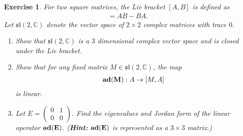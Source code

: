 \documentclass[11pt]{article}
\newtheorem{exercise}{Exercise}[section]
\theoremstyle{definition}
\numberwithin{equation}{subsection}
\begin{document}
\medskip

\begin{exercise}
For two square matrices, the Lie bracket $[A, B]$ is defined as
\begin{align*}
    [A, B] = AB - BA.
\end{align*}
Let $\mathfrak{sl}(2, \mathbb{C})$ denote the vector space of $2 \times 2$ complex matrices with trace $0$.
\begin{enumerate}[label=(\alph*)]
    \item Show that $\mathfrak{sl}(2, \mathbb{C})$ is a $3$ dimensional complex vector space and is closed under the Lie bracket.
    
    \item Show that for any fixed matrix $M \in \mathfrak{sl}(2, \mathbb{C})$, the map
    \begin{align*}
        {\bf ad}({\bf M}): A \to [M, A]
    \end{align*}
    is linear.
    
    \item Let $E = \begin{pmatrix} 0 & 1 \\ 0 & 0 \end{pmatrix}$. Find the eigenvalues and Jordan form of the linear operator ${\bf ad}({\bf E})$. (\textbf{Hint:} ${\bf ad}({\bf E})$ is represented as a $3 \times 3$ matrix.)
\end{enumerate}
\end{exercise}
\end{document}

